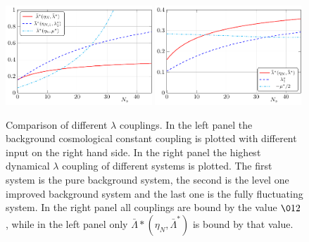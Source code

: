 \documentclass[11pt]{book} %
\begin{document}
{\begin{figure}
\includegraphics[width=0.49\textwidth]{Background-lam-comparison}
\hfill
\includegraphics[width=0.49\textwidth]{Fluctuation-lam-comparison}
\caption{Comparison of different $\lambda$ couplings.
In the left panel the background cosmological constant coupling is plotted with different input on the right hand side.
In the right panel the highest dynamical $\lambda$ coupling of different systems is plotted.
The first system is the pure background system, the second is the level one improved background system and the last one is the fully fluctuating system.
In the right panel all couplings are bound by the value $\012$, while in the left panel only $\bar \Lambda*(\eta_N,\bar\Lambda^*)$ is bound by that value.}
\label{fig:Comparison-of-lam}
\end{figure}

}
\end{document}
